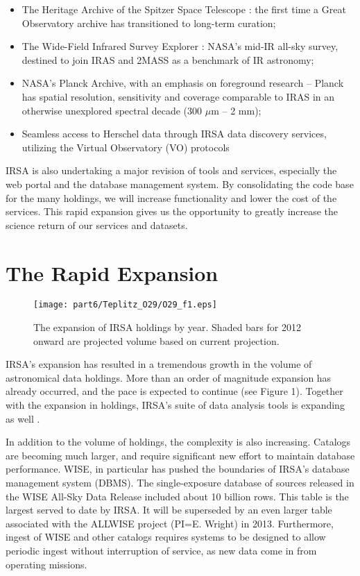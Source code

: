 \begin{itemize}

\item The Heritage Archive of the Spitzer Space Telescope \citep[SHA][]{werner04}: the first time a Great Observatory archive has transitioned to long-term curation; 
\item The Wide-Field Infrared Survey Explorer \citep[WISE][]{wright10}: NASA’s mid-IR all-sky survey, destined to join IRAS and 2MASS as a benchmark of IR astronomy; 
\item NASA's Planck Archive, with an emphasis on foreground research -- Planck \citet{planck11} has spatial resolution, sensitivity and coverage comparable to IRAS in an otherwise unexplored spectral decade (300 $\mu$m – 2 mm); 
\item Seamless access to Herschel data through IRSA data discovery services, utilizing the Virtual Observatory (VO) protocols

\end{itemize}

IRSA is also undertaking a major revision of tools and services, especially the web portal and the database management system. By consolidating the code base for the many holdings, we will increase functionality and lower the cost of the services. This rapid expansion gives us the opportunity to greatly increase the science return of our services and datasets.

\section{The Rapid Expansion}

\begin{figure}[t]

\centering
\texttt{[image: part6/Teplitz\_O29/O29\_f1.eps]}
\caption{The expansion of IRSA holdings by year.  Shaded  bars for 2012 onward are projected volume based on current projection.}

\end{figure}


IRSA's expansion has resulted in a tremendous growth in the volume of astronomical data holdings.  More than an order of magnitude expansion has already occurred, and the pace is expected to continue (see Figure 1).  Together with the expansion in holdings, IRSA's suite of data analysis tools is expanding as well \citep{teplitz12}.

In addition to the volume of holdings, the complexity is also increasing.  Catalogs are becoming much larger, and require significant new effort to maintain database performance.  WISE, in particular has pushed the boundaries of IRSA's database management system (DBMS).  The single-exposure database of sources released in the WISE All-Sky Data Release included about 10 billion rows.  This table is the largest served to date by IRSA. It will be superseded by an even larger table associated with the ALLWISE project (PI=E. Wright) in 2013.  Furthermore, ingest of WISE and other catalogs requires systems to be designed to allow periodic ingest without interruption of service, as new data come in from operating missions.  


